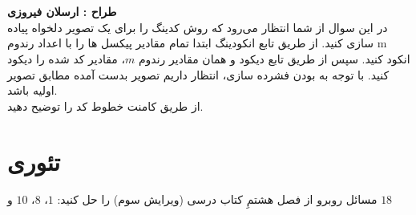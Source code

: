 \documentclass[a4]{article}
\begin{document}
\section{}

\textbf{طراح :‌ ارسلان فیروزی}
\\
در این سوال از شما انتظار می‌رود که روش کدینگ 
 را برای یک تصویر
 دلخواه پیاده سازی کنید. از طریق تابع انکودینگ ابتدا تمام مقادیر پیکسل ها را با اعداد رندوم m انکود کنید. سپس از طریق تابع دیکود و همان مقادیر رندوم
  $ m $،
   مقادیر کد شده را دیکود کنید. با توجه به 
   بودن فشرده سازی، انتظار داریم تصویر بدست آمده مطابق تصویر اولیه باشد.\\
از طریق کامنت خطوط کد را توضیح دهید.
\section{تئوری}
	مسائل روبرو از فصل هشتمِ کتاب درسی (ویرایش سوم) را حل کنید:
	 $ 1 $، $ 8 $، $ 10 $ و $ 18 $
\end{document}
